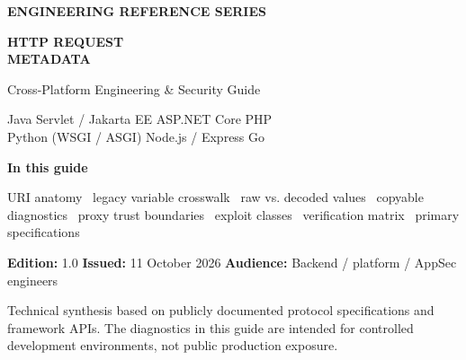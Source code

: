 \documentclass[10pt,letterpaper,oneside]{article}
\begin{document}
\begin{titlepage}
\thispagestyle{empty}
\vspace*{1.05in}
{\sffamily\bfseries\color{teal}\fontsize{13}{16}\selectfont ENGINEERING REFERENCE SERIES}\par
\vspace{0.28in}
{\sffamily\bfseries\color{navy}\fontsize{31}{38}\selectfont HTTP REQUEST\\[4pt]METADATA}\par
\vspace{0.12in}
{\sffamily\color{blue}\fontsize{17}{24}\selectfont Cross-Platform Engineering \& Security Guide}\par
\vspace{0.35in}
\vspace{0.37in}
{\large\color{graytext}Java Servlet / Jakarta EE \quad\textbullet\quad ASP.NET Core \quad\textbullet\quad PHP\\
Python (WSGI / ASGI) \quad\textbullet\quad Node.js / Express \quad\textbullet\quad Go}\par
\vfill
\begin{tcolorbox}[colback=pale,colframe=linegray,boxrule=0.5pt,arc=1.5mm,left=13pt,right=13pt,top=12pt,bottom=12pt]
\textbf{In this guide}\par
URI anatomy \textbullet\ legacy variable crosswalk \textbullet\ raw vs. decoded values \textbullet\ copyable diagnostics \textbullet\ proxy trust boundaries \textbullet\ exploit classes \textbullet\ verification matrix \textbullet\ primary specifications
\end{tcolorbox}
\vspace{0.27in}
{\small\textbf{Edition:} 1.0 \qquad \textbf{Issued:} 11 October 2026 \qquad \textbf{Audience:} Backend / platform / AppSec engineers}\par
{\footnotesize\color{graytext}Technical synthesis based on publicly documented protocol specifications and framework APIs. The diagnostics in this guide are intended for controlled development environments, not public production exposure.}
\end{titlepage}
\tableofcontents
\clearpage
\end{document}

